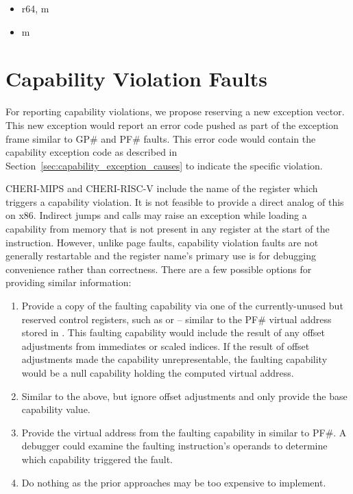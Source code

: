 \begin{itemize}
  \item {} r64, m
  \item {} m
\end{itemize}

\section{Capability Violation Faults}
\label{sec:x86:capability-fault}

For reporting capability violations, we propose reserving a new
exception vector.  This new exception would report an error code
pushed as part of the exception frame similar to GP\# and PF\# faults.
This error code would contain the capability exception code as
described in Section~\ref{sec:capability_exception_causes} to indicate
the specific violation.

CHERI-MIPS and CHERI-RISC-V include the name of the register which
triggers a capability violation.  It is not feasible to provide a
direct analog of this on x86.  Indirect jumps and calls may raise an
exception while loading a capability from memory that is not present
in any register at the start of the instruction.  However, unlike page
faults, capability violation faults are not generally restartable and
the register name's primary use is for debugging convenience rather than
correctness.  There are a few possible options for providing similar
information:

\begin{enumerate}
\item Provide a copy of the faulting capability via one of the
  currently-unused but reserved control registers, such as \CRFIVE{}
  or \CRTWELVE{} -- similar to the PF\# virtual address stored in
  \CRTWO{}.  This faulting capability would include the result of any
  offset adjustments from immediates or scaled indices.  If the result
  of offset adjustments made the capability unrepresentable, the
  faulting capability would be a null capability holding the computed
  virtual address.
\item Similar to the above, but ignore offset adjustments and only
  provide the base capability value.
\item Provide the virtual address from the faulting capability in
  \CRTWO{} similar to PF\#.  A debugger could examine the faulting
  instruction's operands to determine which capability triggered the fault.
\item Do nothing as the prior approaches may be too expensive to
  implement.
\end{enumerate}

